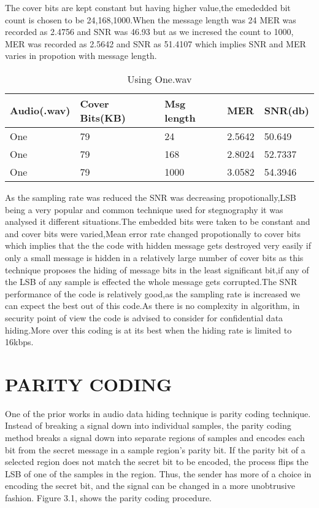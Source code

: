 \documentclass[a4paper, 12pt, notitlepage]{report}
\begin{document}
The cover bits are kept constant but having higher value,the emededded bit count is chosen to be 24,168,1000.When the message length was 24 MER was recorded as 2.4756 and SNR was 46.93 but as we incresed the count to 1000, MER was recorded as 2.5642  and SNR as 51.4107 which implies SNR and MER varies in propotion with message length.

\begin{table}[h]
\begin{tabular}{|l|l|l|l|l|}
\hline
\textbf{ Audio(.wav)}&\textbf{Cover Bits(KB)}&\textbf{Msg length}&\textbf{MER}&\textbf{SNR(db)} \\ \hline
 One&79  &24  &2.5642  &50.649  \\ \hline
 One&79  &168  &2.8024  &52.7337  \\ \hline
 One&79  &1000  &3.0582  &54.3946  \\ \hline
\end{tabular}
\caption{Using One.wav}
\end{table}

As the sampling rate was reduced the SNR was decreasing propotionally,LSB being a very popular and common technique used for stegnography it was analysed it different situations.The embedded bits were taken to be constant and and cover bits were varied,Mean error rate changed propotionally to cover bits which implies that the the code with hidden message gets destroyed very easily if only a small message is hidden in a relatively large number of cover bits as this technique proposes the hiding of message bits in the least significant bit,if any of the LSB of any sample is effected the whole message gets corrupted.The SNR performance of the code is relatively good,as the sampling rate is increased we can expect the best out of this code.As there is no complexity in algorithm, in security point of view the code is advised to consider for confidential data hiding.More over this coding is at its best when the hiding rate is limited to 16kbps.\\

\chapter{PARITY CODING}
One of the prior works in audio data hiding technique is parity coding technique. Instead of breaking a signal down into individual samples, the parity coding method breaks a signal down into separate regions of samples and encodes each bit from the secret message in a sample region's parity bit. If the parity bit of a selected region does not match the secret bit to be encoded, the process flips the LSB of one of  the samples in the region. Thus, the sender has more of a choice in encoding the secret bit, and the signal can be changed in a more unobtrusive fashion. Figure 3.1, shows the parity coding procedure.\\
\end{document}
